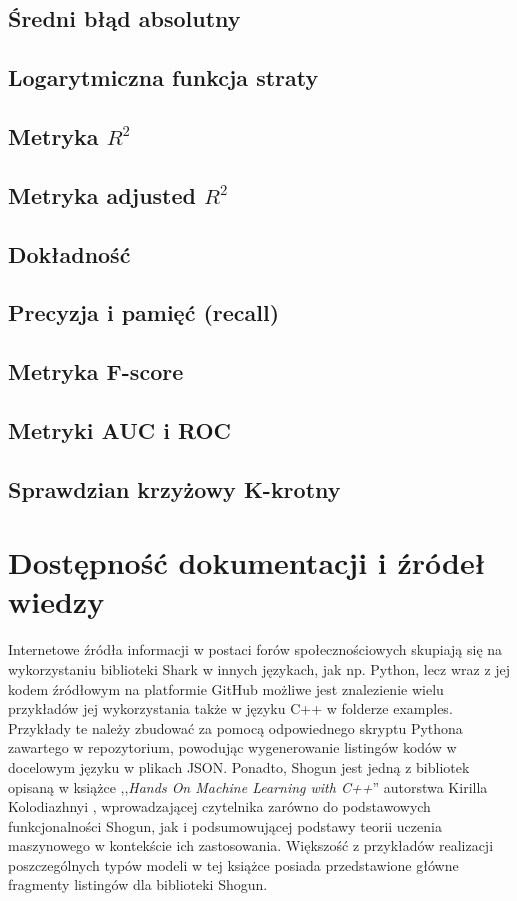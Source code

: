 \subsection{Średni błąd absolutny}

\subsection{Logarytmiczna funkcja straty}
\subsection{Metryka $R^2$}
\subsection{Metryka adjusted $R^2$}
\subsection{Dokładność}
\subsection{Precyzja i pamięć (recall)}
\subsection{Metryka F-score}
\subsection{Metryki AUC i ROC}

\subsection{Sprawdzian krzyżowy K-krotny}


\section{Dostępność dokumentacji i źródeł wiedzy}

Internetowe źródła informacji w postaci forów społecznościowych skupiają się na wykorzystaniu biblioteki Shark w innych językach, jak np. Python, lecz wraz z jej kodem źródłowym na platformie GitHub \cite{shogun:github} możliwe jest znalezienie wielu przykładów jej wykorzystania także w języku C++ w folderze examples. Przykłady te należy zbudować za pomocą odpowiednego skryptu Pythona zawartego w repozytorium, powodując wygenerowanie listingów kodów w docelowym języku w plikach JSON. Ponadto, Shogun jest jedną z bibliotek opisaną w książce ,,\textit{Hands On Machine Learning with C++}'' autorstwa Kirilla Kolodiazhnyi \cite{handsOnMachineLearning}, wprowadzającej czytelnika zarówno do podstawowych funkcjonalności Shogun, jak i podsumowującej podstawy teorii uczenia maszynowego w kontekście ich zastosowania. Większość z przykładów realizacji poszczególnych typów modeli w tej książce posiada przedstawione główne fragmenty listingów dla biblioteki Shogun.

